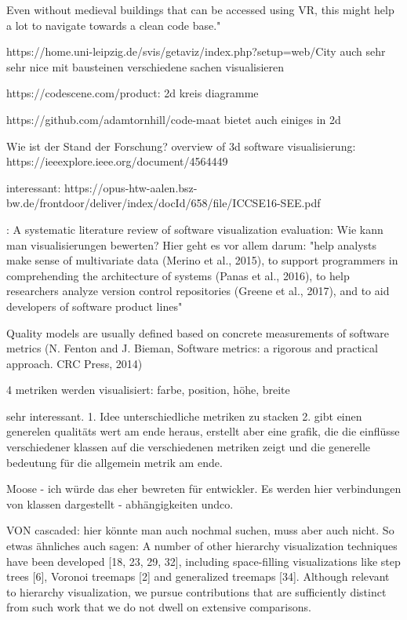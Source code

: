 Even without medieval buildings that can be accessed using VR, this might help a lot to navigate towards a clean code base."


https://home.uni-leipzig.de/svis/getaviz/index.php?setup=web/City%
auch sehr sehr nice
mit bausteinen verschiedene sachen visualisieren


https://codescene.com/product:
2d kreis diagramme

https://github.com/adamtornhill/code-maat
bietet auch einiges in 2d

Wie ist der Stand der Forschung?
overview of 3d software visualisierung: https://ieeexplore.ieee.org/document/4564449

interessant: https://opus-htw-aalen.bsz-bw.de/frontdoor/deliver/index/docId/658/file/ICCSE16-SEE.pdf

\cite{MERINO2018165}:
A systematic literature review of software visualization evaluation:
Wie kann man visualisierungen bewerten?
Hier geht es vor allem darum: "help analysts make sense of multivariate data
(Merino et al., 2015), to support programmers in comprehending the
architecture of systems (Panas et al., 2016), to help researchers analyze
version control repositories (Greene et al., 2017), and to aid developers
of software product lines"


Quality models are usually defined based on concrete measurements of software metrics (N. Fenton and J. Bieman, Software metrics: a rigorous and practical approach. CRC Press, 2014)

4 metriken werden visualisiert: farbe, position, höhe, breite

sehr interessant.
1. Idee unterschiedliche metriken zu stacken
2. gibt einen generelen qualitäts wert am ende heraus, erstellt aber eine grafik, die die einflüsse verschiedener klassen auf die verschiedenen metriken zeigt und die generelle bedeutung für die allgemein metrik am ende.

Moose - ich würde das eher bewreten für entwickler. Es werden hier verbindungen von klassen dargestellt - abhängigkeiten undco.





VON cascaded: hier könnte man auch nochmal suchen, muss aber auch nicht.
So etwas ähnliches auch sagen:
A number of other hierarchy visualization techniques have been
developed [18, 23, 29, 32], including space-filling visualizations
like step trees [6], Voronoi treemaps [2] and generalized treemaps
[34]. Although relevant to hierarchy visualization, we pursue
contributions that are sufficiently distinct from such work that we
do not dwell on extensive comparisons. \cite{lu2008cascaded}